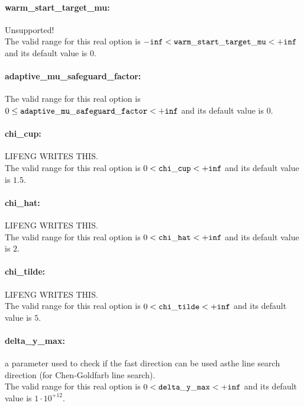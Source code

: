 \paragraph{warm\_start\_target\_mu:}\label{sec:warm_start_target_mu} Unsupported! $\;$ \\
 The valid range for this real option is 
${\tt -inf} <  {\tt warm\_start\_target\_mu } <  {\tt +inf}$
and its default value is $0$.


\paragraph{adaptive\_mu\_safeguard\_factor:}\label{sec:adaptive_mu_safeguard_factor}  $\;$ \\
 The valid range for this real option is 
$0 \le {\tt adaptive\_mu\_safeguard\_factor } <  {\tt +inf}$
and its default value is $0$.


\paragraph{chi\_cup:}\label{sec:chi_cup} LIFENG WRITES THIS. $\;$ \\
 The valid range for this real option is 
$0 <  {\tt chi\_cup } <  {\tt +inf}$
and its default value is $1.5$.


\paragraph{chi\_hat:}\label{sec:chi_hat} LIFENG WRITES THIS. $\;$ \\
 The valid range for this real option is 
$0 <  {\tt chi\_hat } <  {\tt +inf}$
and its default value is $2$.


\paragraph{chi\_tilde:}\label{sec:chi_tilde} LIFENG WRITES THIS. $\;$ \\
 The valid range for this real option is 
$0 <  {\tt chi\_tilde } <  {\tt +inf}$
and its default value is $5$.


\paragraph{delta\_y\_max:}\label{sec:delta_y_max} a parameter used to check if the fast direction can be used asthe line search direction (for Chen-Goldfarb line search). $\;$ \\
 The valid range for this real option is 
$0 <  {\tt delta\_y\_max } <  {\tt +inf}$
and its default value is $1 \cdot 10^{+12}$.


